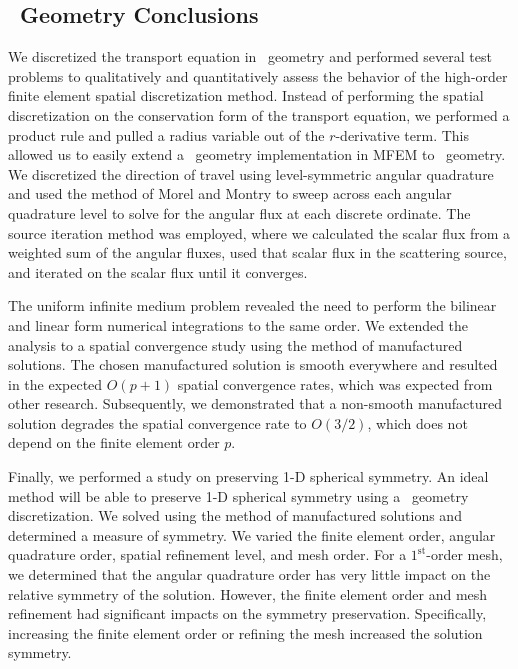 \documentclass[12pt]{article}
\begin{document}
\subsection{\RZ\ Geometry Conclusions}
\label{sec:RZConclusions}
We discretized the transport equation in \RZ\ geometry and performed several test problems to qualitatively and quantitatively assess the behavior of the high-order finite element spatial discretization method. Instead of performing the spatial discretization on the conservation form of the transport equation, we performed a product rule and pulled a radius variable out of the $r$-derivative term. This allowed us to easily extend a \XY\ geometry implementation in MFEM to \RZ\ geometry. We discretized the direction of travel using level-symmetric angular quadrature and used the method of Morel and Montry to sweep across each angular quadrature level to solve for the angular flux at each discrete ordinate. The source iteration method was employed, where we calculated the scalar flux from a weighted sum of the angular fluxes, used that scalar flux in the scattering source, and iterated on the scalar flux until it converges.

The uniform infinite medium problem revealed the need to perform the bilinear and linear form numerical integrations to the same order. We extended the analysis to a spatial convergence study using the method of manufactured solutions. The chosen manufactured solution is smooth everywhere and resulted in the expected $O(p+1)$ spatial convergence rates, which was expected from other research. Subsequently, we demonstrated that a non-smooth manufactured solution degrades the spatial convergence rate to $O(3/2)$, which does not depend on the finite element order $p$.

Finally, we performed a study on preserving 1-D spherical symmetry. An ideal method will be able to preserve 1-D spherical symmetry using a \RZ\ geometry discretization. We solved using the method of manufactured solutions and determined a measure of symmetry. We varied the finite element order, angular quadrature order, spatial refinement level, and mesh order. For a $1^\text{st}$-order mesh, we determined that the angular quadrature order has very little impact on the relative symmetry of the solution. However, the finite element order and mesh refinement had significant impacts on the symmetry preservation. Specifically, increasing the finite element order or refining the mesh increased the solution symmetry.
\end{document}
